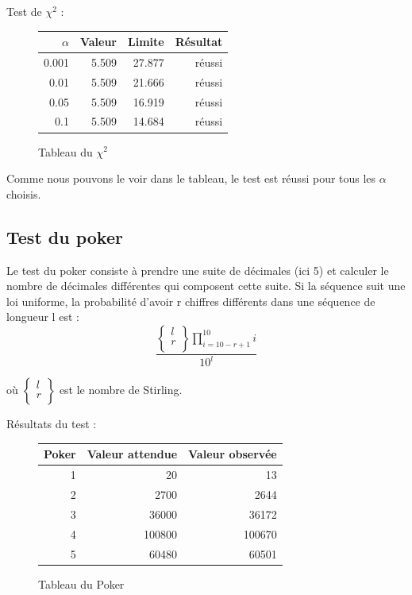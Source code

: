 \documentclass[10pt,a4paper]{article}
\begin{document}
	\newpage
	Test de $\chi^2$ :
	\begin{figure}[h]
		\centering
		\begin{tabular}{|r|r|r|r|}
			\hline
			$\alpha$ & Valeur & Limite & Résultat\\
			\hline
			0.001 & 5.509 & 27.877 & réussi\\
			0.01 & 5.509 & 21.666 & réussi\\
			0.05 & 5.509 & 16.919 & réussi\\
			0.1 & 5.509 & 14.684 & réussi\\
			\hline
		\end{tabular}
		\caption{Tableau du $\chi^2$}
	\end{figure}
	
	Comme nous pouvons le voir dans le tableau, le test est réussi pour tous les $\alpha$ choisis.
	
	\newpage
	\subsection{Test du poker}
	
	Le test du poker consiste à prendre une suite de décimales (ici 5) et calculer le nombre de décimales différentes qui composent cette suite. Si la séquence suit une loi uniforme, la probabilité d'avoir r chiffres différents dans une séquence de longueur l est :
	\[
		\frac{
			\left\{
				\begin{array}{l}
					l\\
					r\\
				\end{array}
			\right\}
			\prod_{i=10-r+1}^{10}i
		}{10^l}
	\]
	
	où $\left\{
	\begin{array}{l}
	l\\
	r\\
	\end{array}
	\right\}$ est le nombre de Stirling.
	
	Résultats du test :
	\begin{figure}[h]
		\centering
		\begin{tabular}{|r|r|r|}
			\hline
			Poker & Valeur attendue & Valeur observée\\
			\hline
			1 & 20 & 13\\
			2 & 2700 & 2644\\
			3 & 36000 & 36172\\
			4 & 100800 & 100670\\
			5 & 60480 & 60501\\
			\hline
		\end{tabular}
		\caption{Tableau du Poker}
	\end{figure}
	
\end{document}
